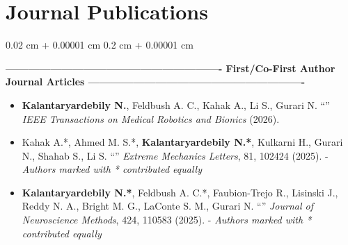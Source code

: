 \documentclass[10pt, letterpaper]{article}
\newenvironment{highlights}{
    \begin{itemize}[
        topsep=0.10 cm,
        parsep=0.10 cm,
        partopsep=0pt,
        itemsep=0pt,
        leftmargin=0.2 cm + 10pt
    ]
}{
    \end{itemize}
} %
\newenvironment{onecolentry}{
    \begin{adjustwidth}{
        0.02 cm + 0.00001 cm
    }{
        0.2 cm + 0.00001 cm
    }
}{
    \end{adjustwidth}
} %
\let\hrefWithoutArrow\href
\renewcommand{\href}[2]{\hrefWithoutArrow{#1}{#2}}
\begin{document}
\vspace{-.8em}


\section{Journal Publications}
\begin{onecolentry}
\vspace{-.23em}

\hspace{1.5em} \textbf{---------------------------------------------------------- First/Co-First Author Journal Articles ----------------------------------------------------------}\\
\begin{highlights}
\vspace{-1em}
    \item \textbf{Kalantaryardebily N.}, Feldbush A. C., Kahak A., Li S., Gurari N. ``{\href{https://ieeexplore.ieee.org/document/11311108}{\color{black}{Novel Compact Tactile Stimulator with Sensing: Application for Individuals with a Brain Injury and MRI}}}'' \textit{IEEE Transactions on Medical Robotics and Bionics} (2026).

    \item Kahak A.*, Ahmed M. S.*, \textbf{Kalantaryardebily N.*}, Kulkarni H., Gurari N., Shahab S., Li S. ``{\href{https://www.sciencedirect.com/science/article/abs/pii/S2352431625001361}{\color{black}{High-Precision Fluidic Kirigami Metasurface for Ultrasonic Holographic Lensing and Haptic Interfacing}}}'' \textit{Extreme Mechanics Letters}, 81, 102424 (2025). - {\textit{Authors marked with * contributed equally}}

    
    \item \textbf{Kalantaryardebily N.*}, Feldbush A. C.*, Faubion-Trejo R., Lisinski J., Reddy N. A., Bright M. G., LaConte S. M., Gurari N. ``{\href{https://www.sciencedirect.com/science/article/abs/pii/S0165027025002274}{\color{black}{Development and Testing of an MR-Compatible Tactile Stimulator System: Application for Individuals with a Brain Injury}}}'' \textit{Journal of Neuroscience Methods}, 424, 110583 (2025). - {\textit{Authors marked with * contributed equally}}


\end{highlights}
\end{onecolentry}
\end{document}
